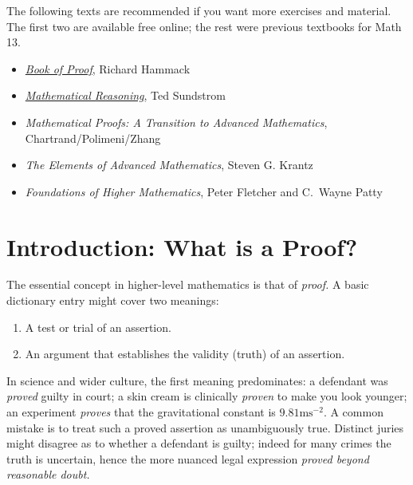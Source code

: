 
The following texts are recommended if you want more exercises and material. The first two are available free online; the rest were previous textbooks for Math 13.

\begin{itemize}%
	\item \href{http://www.people.vcu.edu/~rhammack/BookOfProof/}{\emph{Book of Proof}}, Richard Hammack%
	
	\item \href{http://scholarworks.gvsu.edu/books/9/}{\emph{Mathematical Reasoning}}, Ted Sundstrom%

	\item \emph{Mathematical Proofs: A Transition to Advanced Mathematics}, Chartrand/Polimeni/Zhang%
	\item \emph{The Elements of Advanced Mathematics}, Steven G. Krantz%
	\item \emph{Foundations of Higher Mathematics}, Peter Fletcher and C.~Wayne Patty%
\end{itemize}




\clearpage

\section{Introduction: What is a Proof?}\label{chap:intro}


The essential concept in higher-level mathematics is that of \emph{proof.} A basic dictionary entry might cover two meanings:
\begin{enumerate}%
	\item A test or trial of an assertion.
	\item An argument that establishes the validity (truth) of an assertion.
\end{enumerate}
In science and wider culture, the first meaning predominates: a defendant was \emph{proved} guilty in court; a skin cream is clinically \emph{proven} to make you look younger; an experiment \emph{proves} that the gravitational constant is $9.81\mathrm{ms}^{-2}$. A common mistake is to treat such a proved assertion as unambiguously true. Distinct juries might disagree as to whether a defendant is guilty; indeed for many crimes the truth is uncertain, hence the more nuanced legal expression \emph{proved beyond reasonable doubt.}\smallbreak

